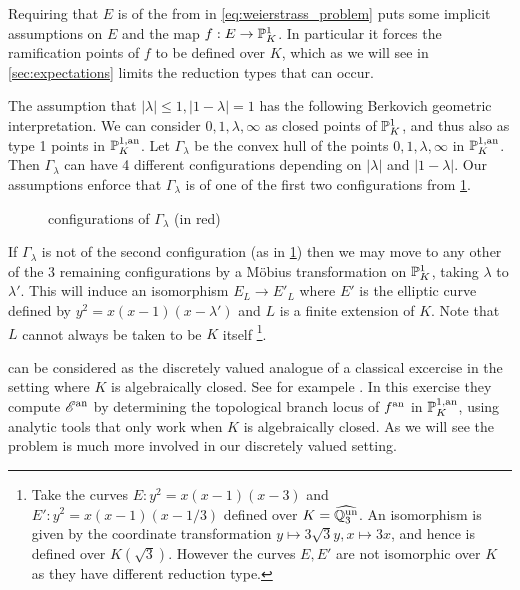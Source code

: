 Requiring that $E$ is of the from in \eqref{eq:weierstrass_problem} puts some implicit assumptions on $E$ and the map $f: E \to \mathbb{P}^{1}_K$.
In particular it forces the ramification points of $f$ to be defined over $K$, which as we will see in \cref{sec:expectations} limits the reduction types that can occur. 

The assumption that $|\lambda| \le 1, |1 - \lambda| = 1$ has the following Berkovich geometric interpretation.
We can consider $0, 1, \lambda, \infty$ as closed points of $\mathbb{P}^{1}_K$, and thus also as type 1 points in $\mathbb{P}^{1, \text{an}}_K$.
Let  $\Gamma_\lambda$ be the convex hull of the points $0, 1, \lambda, \infty$ in $\mathbb{P}^{1, \text{an}}_K$. 
Then  $\Gamma_\lambda$ can have 4 different configurations depending on $|\lambda|$ and $|1-\lambda|$. 
Our assumptions enforce that $\Gamma_\lambda$ is of one of the first two configurations from \cref{fig:configurations_of_gamma_lambda}.
\begin{figure}[ht]
    \centering
    \caption{configurations of $\Gamma_\lambda$ (in red)}
    \label{fig:configurations_of_gamma_lambda}
\end{figure}
If  $\Gamma_\lambda$ is not of the second configuration (as in \cref{fig:configurations_of_gamma_lambda}) then we may move to any other of the 3 remaining configurations by a Möbius transformation on $\mathbb{P}^{1}_K$, taking $\lambda$ to $\lambda'$. 
This will induce an isomorphism $E_L \to E'_L$ where $E'$ is the elliptic curve defined by $y^2 = x(x-1)(x-\lambda')$ and $L$ is a finite extension of $K$. 
Note  that $L$ cannot always be taken to be $K$ itself
\footnote{Take the curves $E: y^2 = x(x -1)(x-3)$ and $E': y^2 = x(x-1)(x-1 /3)$ defined over $K = \widehat{\mathbb{Q}_3^{\text{un}}}$.
An isomorphism is given by the coordinate transformation $y\mapsto 3\sqrt{3} y, x\mapsto 3x$, and hence is defined over $K(\sqrt{3} )$. However the curves $E, E'$ are not isomorphic over $K$ as they have different reduction type.}.

\begin{remark}
	 can be considered as the discretely valued analogue of a classical excercise in the setting where $K$ is algebraically closed.
	See for exampele \cite[exericise 6.1.3.3]{temkinIntroductionBerkovichAnalytic2010}.  
	In this exercise they compute $\mathscr E{}^{\text{an}}$ by determining the topological branch locus of $f{}^{\text{an}}$ in $\mathbb{P}^{1, \text{an}}_K$, using analytic tools that only work when $K$ is algebraically closed. 
	As we will see the problem is much more involved in our discretely valued setting. 
\end{remark}










